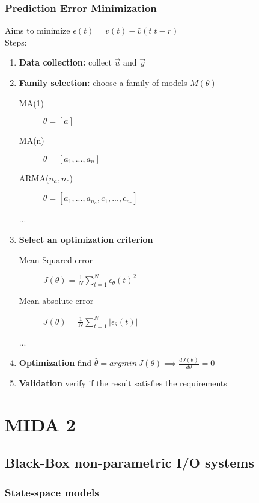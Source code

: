 \documentclass{report}
\let\OldPart\part
\renewcommand{\part}{\newpage\OldPart}
\begin{document}
\section{Prediction Error Minimization} Aims to minimize $\epsilon(t)=v(t)-\hat{v}(t|t-r)$\\
Steps:
\begin{enumerate}
\item \textbf{Data collection:} collect $\vec{u}$ and $\vec{y}$
\item \textbf{Family selection:} choose a family of models $M(\theta)$
	\begin{description}
	\item[MA(1)] $\theta=[a]$
	\item[MA(n)] $\theta=[a_1,...,a_n]$
	\item[ARMA($n_a,n_c$)] $\theta=[a_1,...,a_{n_a},
	c_1,...,c_{n_c}]$
	\item[...]
	\end{description}
\item \textbf{Select an optimization criterion}
	\begin{description}
	\item[Mean Squared error] $J(\theta)=\frac{1}{N}\sum_{t=1}^N \epsilon_\theta(t)^2$
	\item[Mean absolute error] $J(\theta)=\frac{1}{N}\sum_{t=1}^N |\epsilon_\theta(t)|$
	\item[...]
	\end{description}
\item  \textbf{Optimization} find $\hat{\theta}=argmin\,J(\theta)\implies \frac{dJ(\theta)}{d\theta}=0$
\item \textbf{Validation} verify if the result satisfies the requirements
\end{enumerate}

\newpage
\part{MIDA 2}
\chapter{Black-Box non-parametric I/O systems}
\section{State-space models}
\begin{center}
\end{center}
\end{document}
